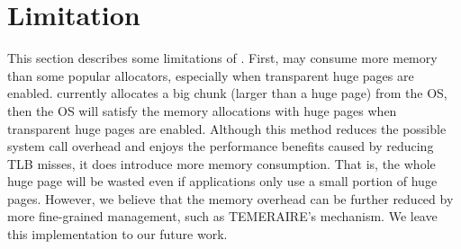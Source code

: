 \section{Limitation}
\label{sec:limit}


This section describes some limitations of \NM{}. First, \NM{} may consume more memory than some popular allocators, especially when transparent huge pages are enabled. \NM{} currently allocates a big chunk (larger than a huge page) from the OS, then the OS will satisfy the memory allocations with huge pages when transparent huge pages are enabled. Although this method reduces the possible system call overhead and enjoys the performance benefits caused by reducing TLB misses, it does introduce more memory consumption. That is, the whole huge page will be wasted even if applications only use a small portion of huge pages. 
However, we believe that the memory overhead can be further reduced by more fine-grained management, such as TEMERAIRE's mechanism. We leave this implementation to our future work.



